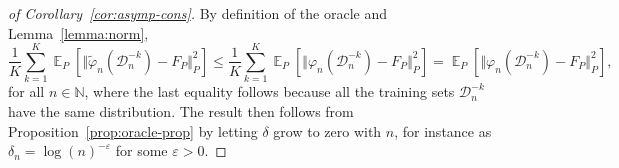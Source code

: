 \documentclass[alpha-refs]{wiley-article}
\DeclareMathOperator{\E}{\mathbb{E}} %
\newcommand{\N}{\mathbb{N}}
\renewcommand{\phi}{\varphi}
\renewcommand{\epsilon}{\varepsilon}
\newcommand{\1}{\mathds{1}}
\newcommand{\data}{\ensuremath{\mathcal{D}}}
\begin{document}
\begin{proof}[of Corollary~\ref{cor:asymp-cons}]
  By definition of the oracle and Lemma~\ref{lemma:norm},
  \begin{equation*}
    \frac{1}{K} \sum_{k=1}^{K} \E_{P}{\left[ \Vert \tilde{\phi}_n(\data_n^{-k}) - F_P \Vert_{P}^2
      \right]} \leq
    \frac{1}{K} \sum_{k=1}^{K}\E_{P}{\left[ \Vert
        \phi_n(\data_n^{-k}) - F_P \Vert_{P}^2
      \right]}
    =
    \E_{P}{\left[ \Vert \phi_n(\data_n^{-k}) - F_P \Vert_{P}^2
      \right]},
  \end{equation*}
  for all \( n \in \N \), where the last equality follows because all
  the training sets \( \data_n^{-k} \) have the same distribution. The
  result then follows from Proposition~\ref{prop:oracle-prop} by
  letting $\delta$ grow to zero with \( n \), for instance as
  $\delta_n = \log(n)^{-\epsilon}$ for some $\epsilon>0$.
\end{proof}





\end{document}
